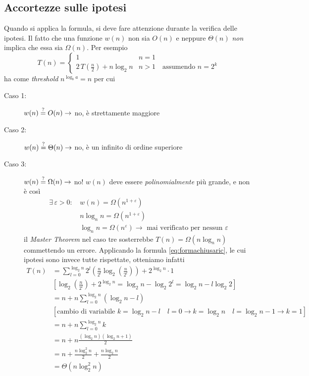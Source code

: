 \subsection{Accortezze sulle ipotesi}
Quando si applica la formula, si deve fare attenzione durante la verifica delle ipotesi.
Il fatto che una funzione $w(n)$ non sia $O(n)$ e neppure $\Theta(n)$ \textit{non} implica che essa sia $\Omega(n)$. Per esempio
\[
    T(n) = 
    \begin{cases} 
        1      &  n = 1 \\
        2 \, T\left(\frac{n}{2}\right) + n \log_2 n & n > 1 \quad \text{assumendo } n=2^k
    \end{cases}
\]
ha come \textit{threshold} $n^{\log_b a} = n$ per cui
\begin{description}
    \item[Caso 1:] $w(n) \overset{?}{=} O(n) \rightarrow $ no, è strettamente maggiore
    \item[Caso 2:] $w(n) \overset{?}{=} \Theta(n) \rightarrow $ no, è un infinito di ordine superiore
    \item[Caso 3:] $w(n) \overset{?}{=} \Omega(n) \rightarrow $
        no! $w(n)$ deve essere \textit{polinomialmente} più grande, e non è così
        \begin{align*}
            \exists \, \varepsilon > 0 :\, & w(n) = \Omega \left( n^{1+\varepsilon} \right) \\
            & n \log_n n = \Omega \left( n^{1+\varepsilon} \right) \\
            & \log_n n = \Omega \left( n^{\varepsilon} \right) \rightarrow
                \text{ mai verificato per nessun $\varepsilon$}
        \end{align*}
        il \textit{Master Theorem} nel caso tre sosterrebbe $T(n)=\Omega \left( n \log_n n \right)$
        commettendo un errore. Applicando la formula \ref{eq:formachiusaric}, le cui ipotesi sono invece tutte rispettate, otteniamo infatti
        \begin{align*}
            T(n) &= \sum_{l=0}^{\log_2 n} 2^l \left( \frac{n}{2^l} \log_2 \left( \frac{n}{2^l} \right) \right) + 2^{\log_2 n} \cdot 1 \\
            & \left[ \log_2 \left( \frac{n}{2^l} \right) + 2^{\log_2 n} = \log_2 n - \log_2 2^l = \log_2 n - l \log_2 2 \right] \\
            & = n + n \sum_{l=0}^{\log_2 n} \left( \log_2 n - l \right) \\
            & \left[ \text{cambio di variabile } k = \log_2n-l \quad
                l=0 \rightarrow k=\log_2 n \quad l=\log_2 n -1 \rightarrow k=1 \right] \\
            & = n + n \sum_{l=0}^{\log_2 n} k \\
            & = n + n \frac{\left( \log_2 n \right) \left( \log_2 n + 1 \right)}{2} \\
            & = n + \frac{n \log_2^2 n }{2}  + \frac{n \log_2 n }{2} \\
            & = \Theta \left( n \log_2^2 n \right) 
        \end{align*}
\end{description}

